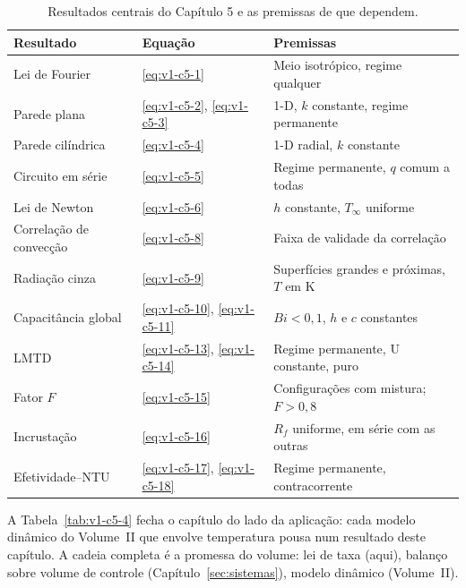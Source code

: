 \documentclass[12pt,a4paper]{article}
\numberwithin{equation}{section}
\numberwithin{table}{section}
\numberwithin{figure}{section}
\begin{document}
\begin{table}[H]
\centering
\caption{Resultados centrais do Capítulo 5 e as premissas de que dependem.}
\label{tab:v1-c5-3}
\begin{tabular}{@{}llp{6.2cm}@{}}
\toprule
\textbf{Resultado} & \textbf{Equação} & \textbf{Premissas} \\
\midrule
Lei de Fourier & \eqref{eq:v1-c5-1} & Meio isotrópico, regime qualquer \\
Parede plana & \eqref{eq:v1-c5-2}, \eqref{eq:v1-c5-3} & 1-D, $k$ constante, regime permanente \\
Parede cilíndrica & \eqref{eq:v1-c5-4} & 1-D radial, $k$ constante \\
Circuito em série & \eqref{eq:v1-c5-5} & Regime permanente, $q$ comum a todas \\
Lei de Newton & \eqref{eq:v1-c5-6} & $h$ constante, $T_\infty$ uniforme \\
Correlação de convecção & \eqref{eq:v1-c5-8} & Faixa de validade da correlação \\
Radiação cinza & \eqref{eq:v1-c5-9} & Superfícies grandes e próximas, $T$ em K \\
Capacitância global & \eqref{eq:v1-c5-10}, \eqref{eq:v1-c5-11} & $Bi < 0{,}1$, $h$ e $c$ constantes \\
LMTD & \eqref{eq:v1-c5-13}, \eqref{eq:v1-c5-14} & Regime permanente, U constante, puro \\
Fator $F$ & \eqref{eq:v1-c5-15} & Configurações com mistura; $F > 0{,}8$ \\
Incrustação & \eqref{eq:v1-c5-16} & $R_f$ uniforme, em série com as outras \\
Efetividade--NTU & \eqref{eq:v1-c5-17}, \eqref{eq:v1-c5-18} & Regime permanente, contracorrente \\
\bottomrule
\end{tabular}
\end{table}

A Tabela~\ref{tab:v1-c5-4} fecha o capítulo do lado da aplicação: cada modelo
dinâmico do Volume~II que envolve temperatura pousa num resultado deste
capítulo. A cadeia completa é a promessa do volume: lei de taxa (aqui),
balanço sobre volume de controle (Capítulo~\ref{sec:sistemas}), modelo
dinâmico (Volume~II).
\end{document}
